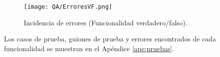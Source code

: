 \begin{figure}[ht!]
  \centering
  \texttt{[image: QA/ErroresVF.png]}
  \caption{Incidencia de errores (Funcionalidad verdadero/falso).}
  \label{fig:ejemploerrores}
\end{figure}

Los casos de prueba, guiones de prueba y errores encontrados de cada funcionalidad se muestran en el Apéndice \ref{ape:pruebas}.